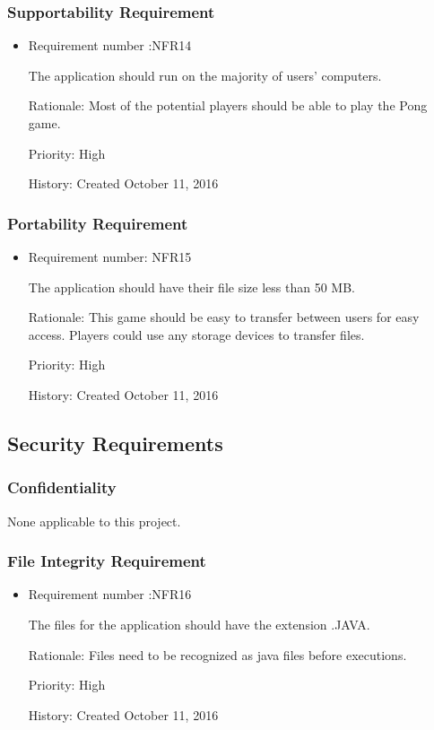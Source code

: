 \documentclass[12pt,letterpaper]{article}
\begin{document}
\subsubsection{Supportability Requirement}
\begin{itemize}
	\item Requirement number :NFR14
	
	 The application should run on the majority of users’ computers.

	Rationale: Most of the potential players should be able to play the Pong game. 
	
	Priority: High    

	History: Created October 11, 2016    
\end{itemize}
\subsubsection{Portability Requirement}
\begin{itemize}
	\item Requirement number: NFR15

	The application should have their file size less than 50 MB.

	Rationale: This game should be easy to transfer between users for easy access. Players could use any storage devices to transfer files.

	Priority: High

	History: Created October 11, 2016
\end{itemize}
\subsection{Security Requirements}
\subsubsection{Confidentiality}
None applicable to this project.
\subsubsection{File Integrity Requirement}
\begin{itemize}
	\item Requirement number :NFR16  
	
	The files for the application should have the extension .JAVA.

	Rationale: Files need to be recognized as java files before executions.
	
	Priority: High     
	 
	History: Created October 11, 2016  
\end{itemize}
\end{document}
